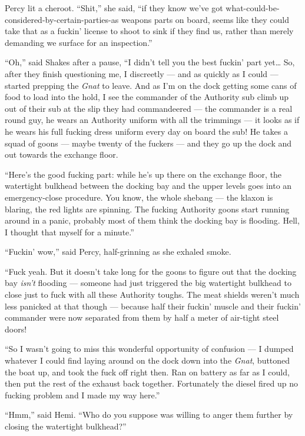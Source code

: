 \documentclass[
]{scrbook}
\begin{document}
Percy lit a cheroot. ``Shit,'' she said, ``if they know we've got
what-could-be-considered-by-certain-parties-as weapons parts on board,
seems like they could take that as a fuckin' license to shoot to sink if
they find us, rather than merely demanding we surface for an
inspection.''

``Oh,'' said Shakes after a pause, ``I didn't tell you the best fuckin'
part yet\ldots{} So, after they finish questioning me, I discreetly ---
and as quickly as I could --- started prepping the \emph{Gnat} to leave.
And as I'm on the dock getting some cans of food to load into the hold,
I see the commander of the Authority sub climb up out of their sub at
the slip they had commandeered --- the commander is a real round guy, he
wears an Authority uniform with all the trimmings --- it looks as if he
wears his full fucking dress uniform every day on board the sub! He
takes a squad of goons --- maybe twenty of the fuckers --- and they go
up the dock and out towards the exchange floor.

``Here's the good fucking part: while he's up there on the exchange
floor, the watertight bulkhead between the docking bay and the upper
levels goes into an emergency-close procedure. You know, the whole
shebang --- the klaxon is blaring, the red lights are spinning. The
fucking Authority goons start running around in a panic, probably most
of them think the docking bay is flooding. Hell, I thought that myself
for a minute.''

``Fuckin' wow,'' said Percy, half-grinning as she exhaled smoke.

``Fuck yeah. But it doesn't take long for the goons to figure out that
the docking bay \emph{isn't} flooding --- someone had just triggered the
big watertight bulkhead to close just to fuck with all these Authority
toughs. The meat shields weren't much less panicked at that though ---
because half their fuckin' muscle and their fuckin' commander were now
separated from them by half a meter of air-tight steel doors!

``So I wasn't going to miss this wonderful opportunity of confusion ---
I dumped whatever I could find laying around on the dock down into the
\emph{Gnat}, buttoned the boat up, and took the fuck off right then. Ran
on battery as far as I could, then put the rest of the exhaust back
together. Fortunately the diesel fired up no fucking problem and I made
my way here.''

``Hmm,'' said Hemi. ``Who do you suppose was willing to anger them
further by closing the watertight bulkhead?''
\end{document}
